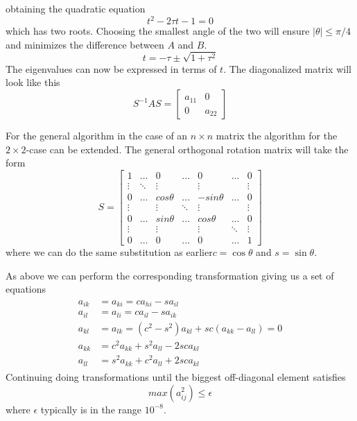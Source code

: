 \documentclass{article}
\begin{document}
obtaining the quadratic equation 
\begin{equation}
t^2-2\tau t-1 =0
\end{equation}
which has two roots. Choosing the smallest angle of the two will ensure $\lvert \theta \rvert \leq \pi/4 $ and minimizes the difference between $ A $ and $ B $.
\begin{equation}
t = -\tau \pm \sqrt{1+{\tau}^2}
\end{equation}
The eigenvalues can now be expressed in terms of $t$. The diagonalized matrix will look like this
\begin{equation}
	S^{-1}AS = \begin{bmatrix}
		a_{11} & 0 \\
		0 & a_{22}
	\end{bmatrix}
\end{equation}

For the general algorithm in the case of an $n \times n$ matrix the algorithm for the $2\times2$-case can be extended. The general orthogonal rotation matrix will take the form 
\begin{equation}
S= \begin{bmatrix}
1 & \hdots & 0 &\hdots & 0 & \hdots & 0 \\
    \vdots & \ddots & \vdots & {} & \vdots & {} & \vdots \\
    0 & \hdots & cos\theta &\hdots & -sin\theta & \hdots & 0 \\
    \vdots & {} & \vdots & \ddots & \vdots & {} & \vdots \\
    0 & \hdots & sin\theta &\hdots & cos\theta & \hdots & 0 \\
    \vdots & {} & \vdots & {} & \vdots & \ddots & \vdots \\
0 & \hdots & 0 &\hdots & 0 & \hdots & 1
\end{bmatrix}
\end{equation}
where we can do the same substitution as earlier$c= \cos{\theta}$ and $s=\sin{\theta}$.

As above we can perform the corresponding transformation giving us a set of equations
\begin{align}
\label{eq:rotation}
\begin{split}
  a_{ik} &= a_{ki} = ca_{hi} - sa_{il} \\
  a_{il} &= a_{li} = ca_{il} - sa_{ik} \\
  a_{kl} &= a_{lk} = (c^2 - s^2)a_{kl} + sc(a_{kk} - a_{ll}) = 0\\
  a_{kk} &= c^2a_{kk} + s^2a_{ll} - 2sca_{kl}\\
  a_{ll} &= s^2a_{kk} + c^2a_{ll} + 2sca_{kl}
\end{split}
\end{align}
Continuing doing transformations until the biggest off-diagonal element satisfies
\begin{equation}
	max(a^2_{ij}) \leq \epsilon 
\end{equation} 
where $\epsilon$ typically is in the range $10^{-8}$.
\end{document}
